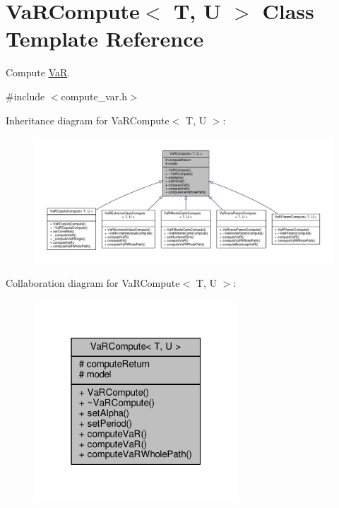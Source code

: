 \hypertarget{classVaRCompute}{}\section{Va\+R\+Compute$<$ T, U $>$ Class Template Reference}
\label{classVaRCompute}


Compute \hyperlink{classVaR}{VaR}.  




{\ttfamily \#include $<$compute\+\_\+var.\+h$>$}



Inheritance diagram for Va\+R\+Compute$<$ T, U $>$\+:
\nopagebreak
\begin{figure}[H]
\begin{center}
\leavevmode
\includegraphics[width=350pt]{classVaRCompute__inherit__graph}
\end{center}
\end{figure}


Collaboration diagram for Va\+R\+Compute$<$ T, U $>$\+:
\nopagebreak
\begin{figure}[H]
\begin{center}
\leavevmode
\includegraphics[width=217pt]{classVaRCompute__coll__graph}
\end{center}
\end{figure}
